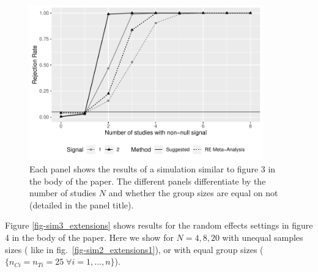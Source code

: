 \documentclass[useAMS,usenatbib,referee]{biom}
\theoremstyle{plain}
\begin{document}
	
	\begin{figure}[htpb]
		\centering
		\includegraphics[page = 2, width=0.9\textwidth, height= 0.46\textheight]{sim4_all.pdf} 
		\caption{  Each panel shows the results of a simulation similar to figure 3 in the body of the paper. The different panels differentiate by the number of studies $N$ and whether the group sizes are equal on not (detailed in the panel title).
		}\label{fig-simFE_extensions}
	\end{figure}
	
	
	
	Figure \ref{fig-sim3_extensions} shows results for the random effects settings in figure 4 in the body of the paper. Here we show for $N=4,8,20$ with unequal samples sizes ( like in fig.~\ref{fig-sim2_extensions1}), or with equal group sizes ( $\{ n_{Ci} = n_{Ti} = 25 \; \forall i=1,\ldots, n\}$). 
	
	
	
	
	
\end{document}
